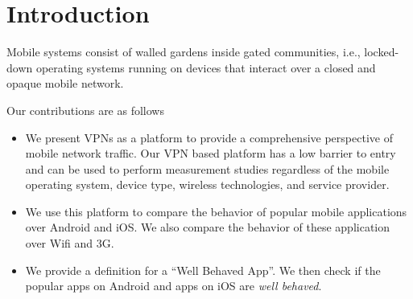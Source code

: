 \section{Introduction}
\label{sec:introduction}

Mobile systems consist of walled gardens inside gated communities,
i.e., locked-down operating systems running on devices that interact
over a closed and opaque mobile network. 

Our contributions are as follows
\begin{itemize}
\item We present VPNs as a platform to provide a comprehensive
  perspective of mobile network traffic. Our VPN based platform has a
  low barrier to entry and can be used to perform measurement studies
  regardless of the mobile operating system, device type, wireless
  technologies, and service provider.    
\item We use this platform to compare the behavior of popular mobile
  applications over Android and iOS. We also compare the behavior of
  these application over Wifi and 3G. 
\item We provide a definition for a ``Well Behaved App''. We then
  check if the  popular apps on Android and 
  apps on iOS are \emph{well behaved}.
\end{itemize}



